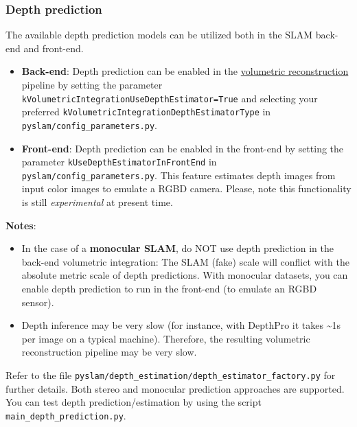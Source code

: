 \documentclass{article}
\begin{document}

\hypertarget{depth-prediction}{%
\subsubsection{Depth prediction}\label{depth-prediction}}

The available depth prediction models can be utilized both in the SLAM
back-end and front-end. 
\begin{itemize}
\item \textbf{Back-end}: Depth prediction can be
enabled in the \protect\hyperlink{volumetric-reconstruction}{volumetric
reconstruction} pipeline by setting the parameter
\texttt{kVolumetricIntegrationUseDepthEstimator=True} and selecting your
preferred \texttt{kVolumetricIntegrationDepthEstimatorType} in
\texttt{pyslam/config\_parameters.py}. 
\item \textbf{Front-end}: Depth prediction
can be enabled in the front-end by setting the parameter
\texttt{kUseDepthEstimator\allowbreak InFrontEnd} in \texttt{pyslam/config\_parameters.py}.
This feature estimates depth images from input color images to emulate a
RGBD camera. Please, note this functionality is still
\emph{experimental} at present time.
\end{itemize}

\textbf{Notes}: 
\begin{itemize}
\item In the case of a \textbf{monocular SLAM}, do NOT use
depth prediction in the back-end volumetric integration: The SLAM (fake)
scale will conflict with the absolute metric scale of depth predictions.
With monocular datasets, you can enable depth prediction to run in the
front-end (to emulate an RGBD sensor). 
\item Depth inference may be
very slow (for instance, with DepthPro it takes \textasciitilde{}1s per
image on a typical machine). Therefore, the resulting volumetric reconstruction
pipeline may be very slow.
\end{itemize}

Refer to the file
\texttt{pyslam/depth\_estimation/depth\_estimator\_factory.py} for further
details. Both stereo and monocular prediction approaches are supported.
You can test depth prediction/estimation by using the script
\texttt{main\_depth\_prediction.py}.

\end{document}
